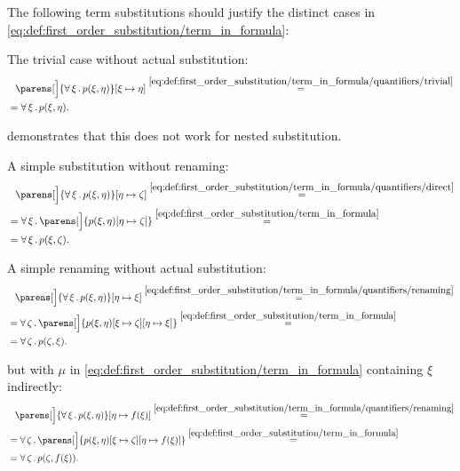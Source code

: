 \begin{example}\label{ex:first_order_substitution}
  The following term substitutions should justify the distinct cases in \eqref{eq:def:first_order_substitution/term_in_formula}:
  \begin{thmenum}
     The trivial case without actual substitution:
    \begin{align*}
      &{}\phantom{=}{}
      \parens[\Big]{\qforall{\xi} p(\xi, \eta)}[\xi \mapsto \eta]
      \overset {\eqref{eq:def:first_order_substitution/term_in_formula/quantifiers/trivial}} = \\ &=
      \qforall{\xi} p(\xi, \eta).
    \end{align*}

     demonstrates that this does not work for nested substitution.

     A simple substitution without renaming:
    \begin{align*}
      &{}\phantom{=}{}
      \parens[\Big]{\qforall{\xi} p(\xi, \eta)}[\eta \mapsto \zeta]
      \overset {\eqref{eq:def:first_order_substitution/term_in_formula/quantifiers/direct}} = \\ &=
      \qforall{\xi} \parens[\Big]{p(\xi, \eta)[\eta \mapsto \zeta]}
      \overset {\eqref{eq:def:first_order_substitution/term_in_formula}} = \\ &=
      \qforall{\xi} p(\xi, \zeta).
    \end{align*}

     A simple renaming without actual substitution:
    \begin{align*}
      &{}\phantom{=}{}
      \parens[\Big]{\qforall{\xi} p(\xi, \eta)}[\eta \mapsto \xi]
      \overset {\eqref{eq:def:first_order_substitution/term_in_formula/quantifiers/renaming}} = \\ &=
      \qforall{\zeta} \parens[\Big]{p(\xi, \eta)[\xi \mapsto \zeta][\eta \mapsto \xi]}
      \overset {\eqref{eq:def:first_order_substitution/term_in_formula}} = \\ &=
      \qforall{\zeta} p(\zeta, \xi).
    \end{align*}

      but with \( \mu \) in \eqref{eq:def:first_order_substitution/term_in_formula} containing \( \xi \) indirectly:
    \begin{align*}
      &{}\phantom{=}{}
      \parens[\Big]{\qforall{\xi} p(\xi, \eta)}[\eta \mapsto f(\xi)]
      \overset {\eqref{eq:def:first_order_substitution/term_in_formula/quantifiers/renaming}} = \\ &=
      \qforall{\zeta} \parens[\Big]{p(\xi, \eta)[\xi \mapsto \zeta][\eta \mapsto f(\xi)]}
      \overset {\eqref{eq:def:first_order_substitution/term_in_formula}} = \\ &=
      \qforall{\zeta} p(\zeta, f(\xi)).
    \end{align*}


\end{thmenum}
\end{example}
